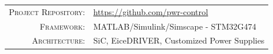 \documentclass[12pt, a4paper]{article}
\newcommand{\MetaLabelA}{Project Repository}
\newcommand{\MetaValueA}{https://github.com/pwr-control}
\newcommand{\MetaLabelB}{Framework}
\newcommand{\MetaValueB}{MATLAB/Simulink/Simscape - STM32G474}
\newcommand{\MetaLabelC}{Architecture}
\newcommand{\MetaValueC}{SiC, EiceDRIVER, Customized Power Supplies}
\begin{document}
\vfill

\noindent
\begin{tabular}{@{} r @{\quad} l @{}}
    \textsc{\small\MetaLabelA:} & {\small\url{\MetaValueA}} \\[3pt]
    \textsc{\small\MetaLabelB:} & {\small\MetaValueB}       \\[3pt]
    \textsc{\small\MetaLabelC:} & {\small\MetaValueC}       \\
\end{tabular}

\newpage
{}
\setcounter{page}{1}

\end{document}
